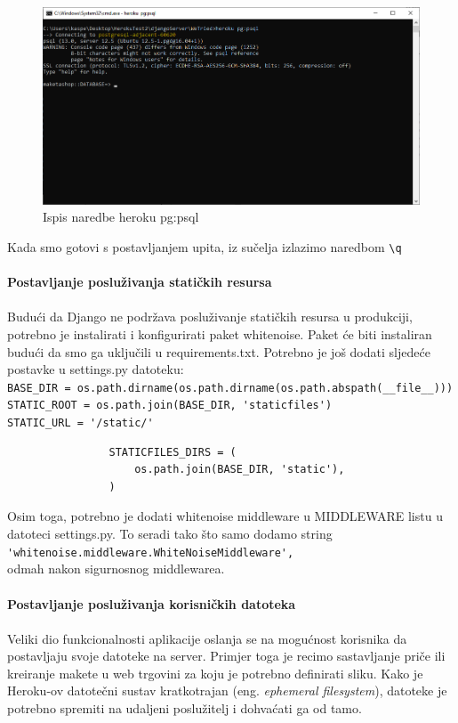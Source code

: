 {			\begin{figure}[H]
				\centering
				\includegraphics[width=1\linewidth]{slike/herokuPostgresql2}
				\caption{Ispis naredbe heroku pg:psql}
				\label{fig:pgpsql}
			\end{figure}
			Kada smo gotovi s postavljanjem upita, iz sučelja izlazimo naredbom \verb|\q|\\
			\\
			\textbf{Postavljanje posluživanja statičkih resursa}
			\\
			\\
			Budući da Django ne podržava posluživanje statičkih resursa u produkciji, potrebno je instalirati i konfigurirati paket whitenoise. Paket će biti instaliran budući da smo ga uključili u requirements.txt. Potrebno je još dodati sljedeće postavke u settings.py datoteku:\\
			\verb|BASE_DIR = os.path.dirname(os.path.dirname(os.path.abspath(__file__)))|\\
			\verb|STATIC_ROOT = os.path.join(BASE_DIR, 'staticfiles')|\\
			\verb|STATIC_URL = '/static/'|
			\begin{verbatim}
				STATICFILES_DIRS = (
					os.path.join(BASE_DIR, 'static'),
				)
			\end{verbatim}
			Osim toga, potrebno je dodati whitenoise middleware u MIDDLEWARE listu u datoteci settings.py. To seradi tako što samo dodamo string\\ \verb|'whitenoise.middleware.WhiteNoiseMiddleware',|\\ odmah nakon sigurnosnog middlewarea.
			\\
			\\
			\textbf{Postavljanje posluživanja korisničkih datoteka}
			\\
			\\
			Veliki dio funkcionalnosti aplikacije oslanja se na mogućnost korisnika da postavljaju svoje datoteke na server. Primjer toga je recimo sastavljanje priče ili kreiranje makete u web trgovini za koju je potrebno definirati sliku. Kako je Heroku-ov datotečni sustav kratkotrajan (eng. \textit{ephemeral filesystem}), datoteke je potrebno spremiti na udaljeni poslužitelj i dohvaćati ga od tamo.\\
}
